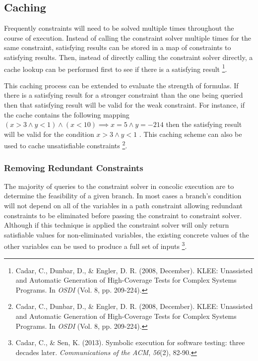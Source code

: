 \documentclass[]{article}
\begin{document}
\hypertarget{header-n90}{%
\subsection{Caching}\label{header-n90}}

Frequently constraints will need to be solved multiple times throughout
the course of execution. Instead of calling the constraint solver
multiple times for the same constraint, satisfying results can be stored
in a map of constraints to satisfying results. Then, instead of directly
calling the constraint solver directly, a cache lookup can be performed
first to see if there is a satisfying result \footnote{Cadar, C.,
  Dunbar, D., \& Engler, D. R. (2008, December). KLEE: Unassisted and
  Automatic Generation of High-Coverage Tests for Complex Systems
  Programs. In \emph{OSDI} (Vol. 8, pp. 209-224).}.

This caching process can be extended to evaluate the strength of
formulas. If there is a satisfying result for a stronger constraint than
the one being queried then that satisfying result will be valid for the
weak constraint. For instance, if the cache contains the following
mapping
\( (x > 3 \land y <1) \land (x < 10) \implies x = 5 \land y =  -214\)
then the satisfying result will be valid for the condition
\(x > 3 \land y < 1 \) . This caching scheme can also be used to cache
unsatisfiable constraints \footnote{Cadar, C., Dunbar, D., \& Engler, D.
  R. (2008, December). KLEE: Unassisted and Automatic Generation of
  High-Coverage Tests for Complex Systems Programs. In \emph{OSDI} (Vol.
  8, pp. 209-224).}.

\hypertarget{header-n95}{%
\subsubsection{Removing Redundant Constraints}\label{header-n95}}

The majority of queries to the constraint solver in concolic execution
are to determine the feasibility of a given branch. In most cases a
branch's condition will not depend on all of the variables in a path
constraint allowing redundant constraints to be eliminated before
passing the constraint to constraint solver. Although if this technique
is applied the constraint solver will only return satisfiable values for
non-eliminated variables, the existing concrete values of the other
variables can be used to produce a full set of inputs \footnote{Cadar,
  C., \& Sen, K. (2013). Symbolic execution for software testing: three
  decades later. \emph{Communications of the ACM}, \emph{56}(2), 82-90.}.
\end{document}
